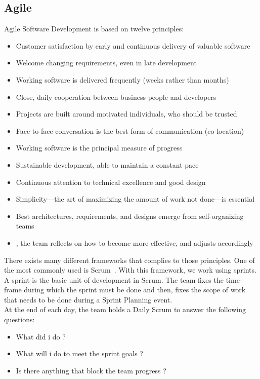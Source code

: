 \documentclass[12pt]{article}
\begin{document}
\subsection{Agile}

Agile Software Development is based on twelve principles:

\begin{itemize}

\item Customer satisfaction by early and continuous delivery of valuable software
\item Welcome changing requirements, even in late development
\item Working software is delivered frequently (weeks rather than months)
\item Close, daily cooperation between business people and developers
\item Projects are built around motivated individuals, who should be trusted
\item Face-to-face conversation is the best form of communication (co-location)
\item Working software is the principal measure of progress
\item Sustainable development, able to maintain a constant pace
\item Continuous attention to technical excellence and good design
\item Simplicity—the art of maximizing the amount of work not done—is essential
\item Best architectures, requirements, and designs emerge from self-organizing teams
\item , the team reflects on how to become more effective, and adjusts accordingly

\end{itemize}

There exists many different frameworks that complies to those principles. One of the most commonly used is Scrum~\cite{ScrumAlliance:2017}. With this framework, we work using sprints. A sprint is the basic unit of development in Scrum. The team fixes the time-frame during which the sprint must be done and then, fixes the scope of work that needs to be done during a Sprint Planning event.\\

At the end of each day, the team holds a Daily Scrum to answer the following questions:

\begin{itemize}

\item What did i do ?
\item What will i do to meet the sprint goals ?
\item Is there anything that block the team progress ?

\end{itemize}
\end{document}
